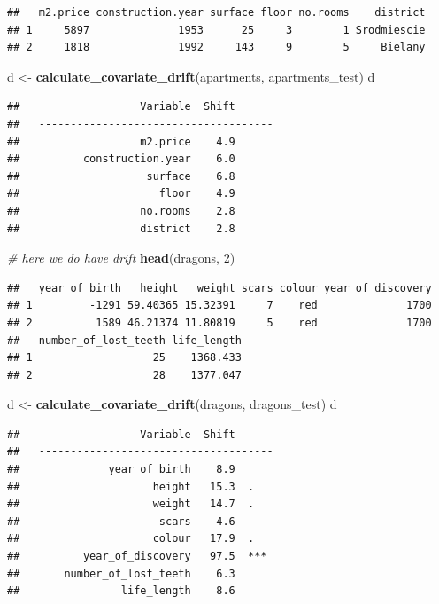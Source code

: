 \documentclass[]{krantz}
\newenvironment{Shaded}{\begin{snugshade}}{\end{snugshade}}
\newcommand{\CommentTok}[1]{\textcolor[rgb]{0.56,0.35,0.01}{\textit{#1}}}
\newcommand{\DecValTok}[1]{\textcolor[rgb]{0.00,0.00,0.81}{#1}}
\newcommand{\KeywordTok}[1]{\textcolor[rgb]{0.13,0.29,0.53}{\textbf{#1}}}
\newcommand{\NormalTok}[1]{#1}
\newcommand{\StringTok}[1]{\textcolor[rgb]{0.31,0.60,0.02}{#1}}
\theoremstyle{definition}
\theoremstyle{definition}
\theoremstyle{definition}
\theoremstyle{remark}
\begin{document}
\begin{verbatim}
##   m2.price construction.year surface floor no.rooms    district
## 1     5897              1953      25     3        1 Srodmiescie
## 2     1818              1992     143     9        5     Bielany
\end{verbatim}

\begin{Shaded}
\begin{Highlighting}[]
\NormalTok{d <-}\StringTok{ }\KeywordTok{calculate_covariate_drift}\NormalTok{(apartments, apartments_test)}
\NormalTok{d}
\end{Highlighting}
\end{Shaded}

\begin{verbatim}
##                   Variable  Shift
##   -------------------------------------
##                   m2.price    4.9  
##          construction.year    6.0  
##                    surface    6.8  
##                      floor    4.9  
##                   no.rooms    2.8  
##                   district    2.8
\end{verbatim}

\begin{Shaded}
\begin{Highlighting}[]
\CommentTok{# here we do have drift}
\KeywordTok{head}\NormalTok{(dragons, }\DecValTok{2}\NormalTok{)}
\end{Highlighting}
\end{Shaded}

\begin{verbatim}
##   year_of_birth   height   weight scars colour year_of_discovery
## 1         -1291 59.40365 15.32391     7    red              1700
## 2          1589 46.21374 11.80819     5    red              1700
##   number_of_lost_teeth life_length
## 1                   25    1368.433
## 2                   28    1377.047
\end{verbatim}

\begin{Shaded}
\begin{Highlighting}[]
\NormalTok{d <-}\StringTok{ }\KeywordTok{calculate_covariate_drift}\NormalTok{(dragons, dragons_test)}
\NormalTok{d}
\end{Highlighting}
\end{Shaded}

\begin{verbatim}
##                   Variable  Shift
##   -------------------------------------
##              year_of_birth    8.9  
##                     height   15.3  .
##                     weight   14.7  .
##                      scars    4.6  
##                     colour   17.9  .
##          year_of_discovery   97.5  ***
##       number_of_lost_teeth    6.3  
##                life_length    8.6
\end{verbatim}
\end{document}

